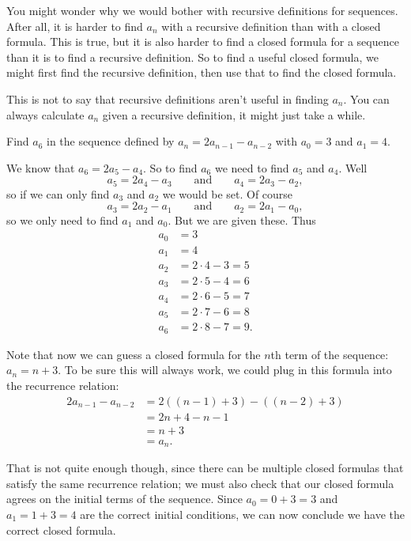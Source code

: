\documentclass[11pt,]{book}
\theoremstyle{ptxplainnotitle}
\theoremstyle{ptxplaintitle}
\theoremstyle{ptxdefinitionnotitle}
\theoremstyle{ptxdefinitiontitle}
\theoremstyle{ptxdefinitionnotitle}
\theoremstyle{ptxdefinitiontitle}
\theoremstyle{ptxdefinitionnotitle}
\theoremstyle{ptxdefinitiontitle}
\theoremstyle{ptxdefinitiontitlenonumber}
\theoremstyle{ptxdefinitiontitlenonumber}
\numberwithin{equation}{chapter}
\newcommand{\amp}{&}
\begin{document}
\hypertarget{p-52}{}%
You might wonder why we would bother with recursive definitions for sequences. After all, it is harder to find \(a_n\) with a recursive definition than with a closed formula. This is true, but it is also harder to find a closed formula for a sequence than it is to find a recursive definition. So to find a useful closed formula, we might first find the recursive definition, then use that to find the closed formula.%
\par
\hypertarget{p-53}{}%
This is not to say that recursive definitions aren't useful in finding \(a_n\). You can always calculate \(a_n\) given a recursive definition, it might just take a while.%
\begin{example}\label{example-3}
\hypertarget{p-54}{}%
Find \(a_6\) in the sequence defined by \(a_n = 2a_{n-1} - a_{n-2}\) with \(a_0 = 3\) and \(a_1 = 4\).%
\par\smallskip%
\noindent\textbf{}\hypertarget{solution-2}{}\hypertarget{p-55}{}%
We know that \(a_6 = 2a_5 - a_4\). So to find \(a_6\) we need to find \(a_5\) and \(a_4\). Well%
\begin{equation*}
a_5 = 2a_4 - a_3 \qquad \text{and} \qquad a_4 = 2a_3 - a_2,
\end{equation*}
so if we can only find \(a_3\) and \(a_2\) we would be set. Of course%
\begin{equation*}
a_3 = 2a_2 - a_1 \qquad \text{and} \qquad a_2 = 2a_1 - a_0,
\end{equation*}
so we only need to find \(a_1\) and \(a_0\). But we are given these. Thus%
\begin{align*}
a_0 \amp = 3\\
a_1 \amp = 4\\
a_2 \amp = 2\cdot 4 - 3 = 5\\
a_3 \amp = 2\cdot 5 - 4 = 6\\
a_4 \amp = 2\cdot 6 - 5 = 7\\
a_5 \amp = 2\cdot 7 - 6 = 8\\
a_6 \amp = 2\cdot 8 - 7 = 9.
\end{align*}
%
\par
\hypertarget{p-56}{}%
Note that now we can guess a closed formula for the \(n\)th term of the sequence: \(a_n = n+3\). To be sure this will always work, we could plug in this formula into the recurrence relation:%
\begin{align*}
2a_{n-1} - a_{n-2} \amp = 2((n-1) + 3) - ((n-2) + 3)\\
\amp = 2n + 4 - n - 1 \\
\amp = n + 3\\
\amp = a_n.
\end{align*}
%
\par
\hypertarget{p-57}{}%
That is not quite enough though, since there can be multiple closed formulas that satisfy the same recurrence relation; we must also check that our closed formula agrees on the initial terms of the sequence.  Since \(a_0 = 0 + 3 = 3\) and \(a_1 = 1+3 = 4\) are the correct initial conditions, we can now conclude we have the correct closed formula.%
\end{example}
\end{document}
